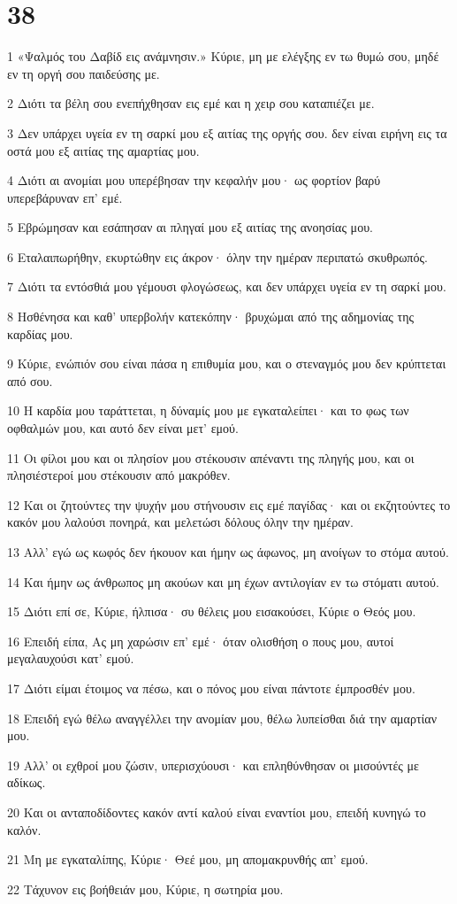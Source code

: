\chapter{38}

\par 1 «Ψαλμός του Δαβίδ εις ανάμνησιν.» Κύριε, μη με ελέγξης εν τω θυμώ σου, μηδέ εν τη οργή σου παιδεύσης με.
\par 2 Διότι τα βέλη σου ενεπήχθησαν εις εμέ και η χειρ σου καταπιέζει με.
\par 3 Δεν υπάρχει υγεία εν τη σαρκί μου εξ αιτίας της οργής σου. δεν είναι ειρήνη εις τα οστά μου εξ αιτίας της αμαρτίας μου.
\par 4 Διότι αι ανομίαι μου υπερέβησαν την κεφαλήν μου· ως φορτίον βαρύ υπερεβάρυναν επ' εμέ.
\par 5 Εβρώμησαν και εσάπησαν αι πληγαί μου εξ αιτίας της ανοησίας μου.
\par 6 Εταλαιπωρήθην, εκυρτώθην εις άκρον· όλην την ημέραν περιπατώ σκυθρωπός.
\par 7 Διότι τα εντόσθιά μου γέμουσι φλογώσεως, και δεν υπάρχει υγεία εν τη σαρκί μου.
\par 8 Ησθένησα και καθ' υπερβολήν κατεκόπην· βρυχώμαι από της αδημονίας της καρδίας μου.
\par 9 Κύριε, ενώπιόν σου είναι πάσα η επιθυμία μου, και ο στεναγμός μου δεν κρύπτεται από σου.
\par 10 Η καρδία μου ταράττεται, η δύναμίς μου με εγκαταλείπει· και το φως των οφθαλμών μου, και αυτό δεν είναι μετ' εμού.
\par 11 Οι φίλοι μου και οι πλησίον μου στέκουσιν απέναντι της πληγής μου, και οι πλησιέστεροί μου στέκουσιν από μακρόθεν.
\par 12 Και οι ζητούντες την ψυχήν μου στήνουσιν εις εμέ παγίδας· και οι εκζητούντες το κακόν μου λαλούσι πονηρά, και μελετώσι δόλους όλην την ημέραν.
\par 13 Αλλ' εγώ ως κωφός δεν ήκουον και ήμην ως άφωνος, μη ανοίγων το στόμα αυτού.
\par 14 Και ήμην ως άνθρωπος μη ακούων και μη έχων αντιλογίαν εν τω στόματι αυτού.
\par 15 Διότι επί σε, Κύριε, ήλπισα· συ θέλεις μου εισακούσει, Κύριε ο Θεός μου.
\par 16 Επειδή είπα, Ας μη χαρώσιν επ' εμέ· όταν ολισθήση ο πους μου, αυτοί μεγαλαυχούσι κατ' εμού.
\par 17 Διότι είμαι έτοιμος να πέσω, και ο πόνος μου είναι πάντοτε έμπροσθέν μου.
\par 18 Επειδή εγώ θέλω αναγγέλλει την ανομίαν μου, θέλω λυπείσθαι διά την αμαρτίαν μου.
\par 19 Αλλ' οι εχθροί μου ζώσιν, υπερισχύουσι· και επληθύνθησαν οι μισούντές με αδίκως.
\par 20 Και οι ανταποδίδοντες κακόν αντί καλού είναι εναντίοι μου, επειδή κυνηγώ το καλόν.
\par 21 Μη με εγκαταλίπης, Κύριε· Θεέ μου, μη απομακρυνθής απ' εμού.
\par 22 Τάχυνον εις βοήθειάν μου, Κύριε, η σωτηρία μου.

